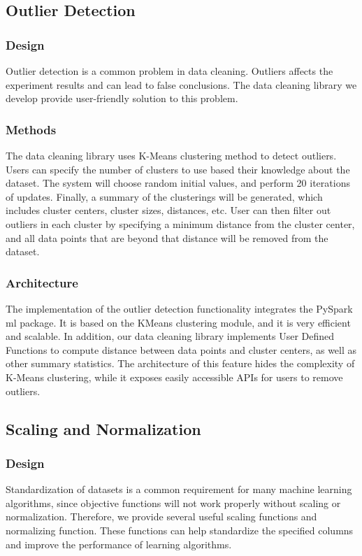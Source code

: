 \documentclass[sigconf]{acmart}
\begin{document}
\subsection{Outlier Detection}
\subsubsection{Design} Outlier detection is a common problem in data cleaning. Outliers affects the experiment results and can lead to false conclusions. The data cleaning library we develop provide user-friendly solution to this problem.
\subsubsection{Methods}
The data cleaning library uses K-Means clustering method to detect outliers. Users can specify the number of clusters to use based their knowledge about the dataset. The system will choose random initial values, and perform 20 iterations of updates. Finally, a summary of the clusterings will be generated, which includes cluster centers, cluster sizes, distances, etc. User can then filter out outliers in each cluster by specifying a minimum distance from the cluster center, and all data points that are beyond that distance will be removed from the dataset.
\subsubsection{Architecture}
The implementation of the outlier detection functionality integrates the PySpark ml package. It is based on the KMeans clustering module, and it is very efficient and scalable. In addition, our data cleaning library implements User Defined Functions to compute distance between data points and cluster centers, as well as other summary statistics. The architecture of this feature hides the complexity of K-Means clustering, while it exposes easily accessible APIs for users to remove outliers.
\subsection{Scaling and Normalization}
\subsubsection{Design} 
Standardization of datasets is a common requirement for many machine learning algorithms, since objective functions will not work properly without scaling or normalization. Therefore, we provide several useful scaling functions and normalizing function. These functions can help standardize the  specified columns and improve the performance of learning algorithms.
\end{document}
